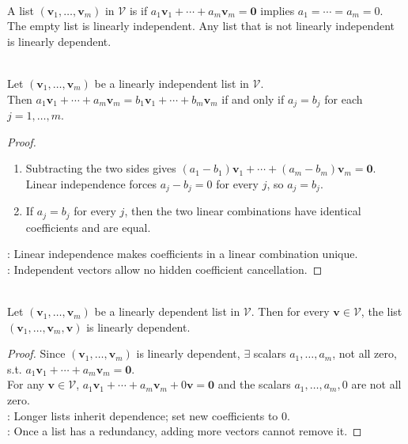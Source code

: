 \begin{definition}  \\
A list $(\mathbf{v}_1, \ldots, \mathbf{v}_m)$ in $\mathcal{V}$ is  if $a_1\mathbf{v}_1 + \cdots + a_m\mathbf{v}_m = \mathbf{0}$ implies $a_1 = \cdots = a_m = 0$. The empty list is linearly independent. Any list that is not linearly independent is linearly dependent.
\end{definition}

\begin{proposition} \label{prop:uniquecoefficientsindependentlist} \\
Let $(\mathbf{v}_1, \ldots, \mathbf{v}_m)$ be a linearly independent list in $\mathcal{V}$.\\
Then $a_1\mathbf{v}_1 + \cdots + a_m\mathbf{v}_m = b_1\mathbf{v}_1 + \cdots + b_m\mathbf{v}_m$ if and only if $a_j=b_j$ for each $j=1,\ldots,m$.
\begin{proof}
\begin{enumerate}[label=\roman*.]
\setlength{\itemsep}{0pt}
\item[$(\Rightarrow)$] Subtracting the two sides gives $(a_1-b_1)\mathbf{v}_1+\cdots+(a_m-b_m)\mathbf{v}_m=\mathbf{0}$.\\
Linear independence forces $a_j-b_j=0$ for every $j$, so $a_j=b_j$.
\item[$(\Leftarrow)$] If $a_j=b_j$ for every $j$, then the two linear combinations have identical coefficients and are equal.
\end{enumerate}
: Linear independence makes coefficients in a linear combination unique.\\
: Independent vectors allow no hidden coefficient cancellation.
\end{proof}
\end{proposition}

\begin{proposition} \label{prop:appendingtodependentlist} \\
Let $(\mathbf{v}_1, \ldots, \mathbf{v}_m)$ be a linearly dependent list in $\mathcal{V}$. Then for every $\mathbf{v}\in\mathcal{V}$, the list $(\mathbf{v}_1, \ldots, \mathbf{v}_m, \mathbf{v})$ is linearly dependent.
\begin{proof}
Since $(\mathbf{v}_1, \ldots, \mathbf{v}_m)$ is linearly dependent, $\exists$ scalars $a_1,\ldots,a_m$, not all zero, s.t. $a_1\mathbf{v}_1 + \cdots + a_m\mathbf{v}_m = \mathbf{0}$.\\
For any $\mathbf{v}\in\mathcal{V}$, $a_1\mathbf{v}_1 + \cdots + a_m\mathbf{v}_m + 0\mathbf{v} = \mathbf{0}$ and the scalars $a_1,\ldots,a_m,0$ are not all zero.\\
: Longer lists inherit dependence; set new coefficients to $0$.\\
: Once a list has a redundancy, adding more vectors cannot remove it.
\end{proof}
\end{proposition}

